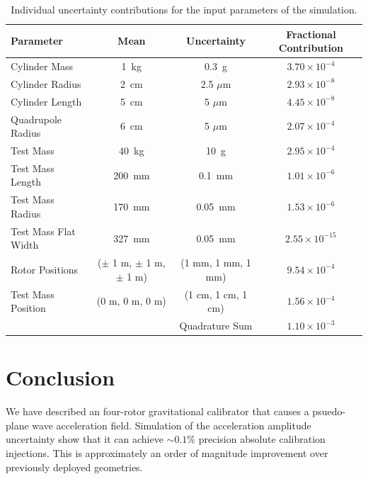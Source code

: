 \documentclass[superscriptaddress, twocolumn, prd]{revtex4-1}
\begin{document}
\begin{widetext}
\begingroup
\setlength{\tabcolsep}{10pt} %
\renewcommand{\arraystretch}{1.5} %

\begin{table}[h!]
\begin{center}
\begin{tabular}{ |l|c|c|c| }
\hline
 Parameter & Mean & Uncertainty & Fractional Contribution\\
 \hline
Cylinder Mass & 1~kg & 0.3~g & $3.70\times10^{-4}$\\
Cylinder Radius & 2~cm & 2.5 $\mu$m & $2.93\times10^{-8}$\\
Cylinder Length & 5~cm & 5 $\mu$m & $4.45\times10^{-8}$\\
Quadrupole Radius & 6~cm & 5 $\mu$m &$2.07\times10^{-4}$\\
Test Mass & 40~kg & 10~g & $2.95\times10^{-4}$\\
Test Mass Length & 200~mm & 0.1~mm& $1.01\times10^{-6}$\\
Test Mass Radius & 170~mm & 0.05~mm& $1.53\times10^{-6}$\\
Test Mass Flat Width & 327~mm & 0.05~mm&$2.55\times10^{-15}$\\
Rotor Positions & ($\pm$ 1 m, $\pm$ 1 m, $\pm$ 1 m) & (1 mm, 1 mm, 1 mm) &$9.54\times10^{-4}$\\
Test Mass Position & (0 m, 0 m, 0 m) & (1 cm, 1 cm, 1 cm) &$1.56\times10^{-4}$\\
 \hline
 \hline
& &Quadrature Sum  &$1.10\times10^{-3}$\\
\hline
 \end{tabular}
 \caption{Individual uncertainty contributions for the input parameters of the simulation.}\label{uncert}
 \end{center}

\end{table}
\endgroup
\end{widetext}

\section{Conclusion}
 
\quad We have described an four-rotor gravitational calibrator that causes a psuedo-plane wave acceleration field. Simulation of the acceleration amplitude uncertainty show that it can achieve $\sim0.1\%$ precision absolute calibration injections. This is approximately an order of magnitude improvement over previously deployed geometries. 
\end{document}
